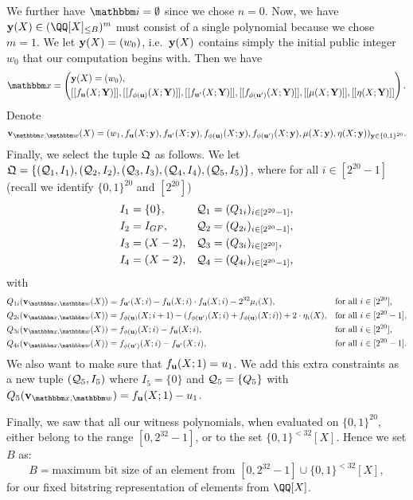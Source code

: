 \documentclass[11pt,letterpaper,usenames,dvipsnames]{article}
\begin{document}
We further have $\idx = \emptyset$ since we chose $n=0$. Now, we have $\yy(X) \in \mainQpolyring^m$ must consist of a single polynomial because we chose $m=1$. We let $\mathbf{y}(X) = (w_0)$, i.e.\ $\mathbf{y}(X)$ contains simply the initial public integer $w_0$ that our computation begins with. Then we have $$\inp = \left(\begin{aligned}&\yy(X)=(w_0),\\ &\oracle{f_{\uu}(X;\YY)}, \oracle{f_{\phi(\uu)}(X;\YY)}, \oracle{f_{\uu'}(X;\YY)}, \oracle{f_{\phi(\uu')}(X;\YY)}, \oracle{\mu(X;\YY)}, \oracle{\eta(X;\YY)}\end{aligned}\right).$$
%
Denote
%
$$
\vv_{\inp,\wit}(X)=(w_1, f_{\uu}(X;\yy), f_{\uu'}(X;\yy), f_{\phi(\uu)}(X;\yy), f_{\phi(\uu')}(X;\yy), \mu(X;\yy), \eta(X;\yy))_{\yy\in \{0,1\}^{20}}.
$$
Finally, we select the tuple $\mathfrak{Q}$ as follows. We let $\mathfrak{Q}=\{(\mathcal{Q}_1, I_1), (\mathcal{Q}_2, I_2), (\mathcal{Q}_3, I_3), (\mathcal{Q}_4, I_4), (\mathcal{Q}_5, I_5)\}$,
where for all $i\in [2^{20}-1]$ (recall we identify $\{0,1\}^{20}$ and $[2^{20}]$)
%
\begin{align*}
    &I_1 = \{0\}, &&\mathcal{Q}_1=(Q_{1i})_{i\in [2^{20}-1]},\\
    &I_2 = I_{GF}, &&\mathcal{Q}_2=(Q_{2i})_{i\in [2^{20}-1]},\\
    &I_3 =(X-2), &&\mathcal{Q}_3=(Q_{3i})_{i\in [2^{20}]},\\
      &I_4 =(X-2), &&\mathcal{Q}_4=(Q_{4i})_{i\in [2^{20}-1]},
\end{align*}
with
\begin{align*}
    Q_{1i}(\vv_{\inp,\wit}(X))&=f_{\uu'}(X; i) - f_{\uu}(X;i)\cdot f_{\uu}(X;i) - 2^{32} \mu_i(X),&& \text{for all } i\in [2^{20}],\\
    Q_{2i}(\vv_{\inp,\wit}(X))&=f_{\phi(\uu)}(X; i+1) - (f_{\phi(\uu')}(X;i) + f_{\phi(\uu)}(X;i)) + 2\cdot \eta_i(X),&& \text{for all } i\in [2^{20}-1],\\
    Q_{3i}(\vv_{\inp,\wit}(X))&=f_{\phi(\uu)}(X;i)-f_{\uu}(X;i), && \text{for all } i\in [2^{20}],\\
    Q_{4i}(\vv_{\inp,\wit}(X))&=f_{\phi(\uu')}(X;i)-f_{\uu'}(X;i), && \text{for all } i\in [2^{20}-1].
\end{align*}
We also want to make sure that $f_{\mathbf{u}}(X; 1)= u_1$. We add this extra constraints as a new tuple  $(\mathcal{Q}_5, I_5)$ where $I_5=\{0\}$ and $\mathcal{Q}_5=\{Q_5\}$ with $Q_5(\vv_{\inp,\wit})= f_{\uu}(X;1)-u_1$.

Finally, we saw that all our witness polynomials, when evaluated on $\{0,1\}^{20}$, either belong to the range $[0, 2^{32}-1]$, or to the set $\{0,1\}^{< 32}[X]$. Hence we set $B$ as:
%
$$
B=\text{maximum bit size of an element from } [0,2^{32}-1] \cup \{0,1\}^{< 32}[X],
$$
for our fixed bitstring representation of elements from $\QQ[X]$.
\end{document}
